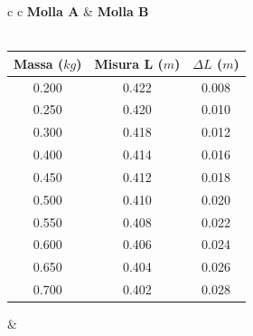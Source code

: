 \begin{center}

\begin{tabular}{c c}
\textbf{Molla A} & \hspace{2cm} \textbf{Molla B}\\
\\
\begin{tabular}{c|c|c}
Massa ($kg$) & Misura L ($m$) & $\Delta L$ ($m$)\\
\midrule
0.200 & 0.422 & 0.008\\
0.250 & 0.420 & 0.010\\
0.300 & 0.418 & 0.012\\
0.400 & 0.414 & 0.016\\
0.450 & 0.412 & 0.018\\
0.500 & 0.410 & 0.020\\
0.550 & 0.408 & 0.022\\
0.600 & 0.406 & 0.024\\
0.650 & 0.404 & 0.026\\
0.700 & 0.402 & 0.028\\
\end{tabular}

& \hspace{2cm}


\end{tabular}
\end{center}
